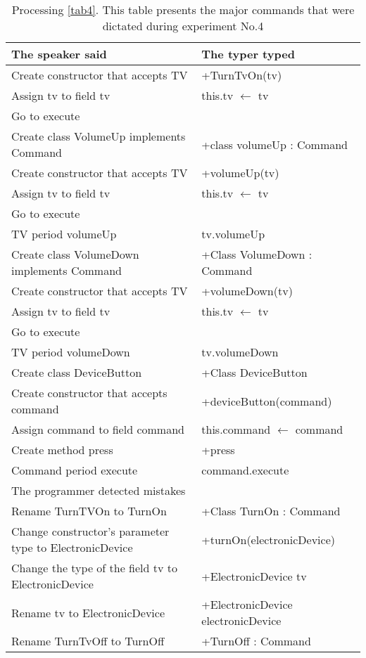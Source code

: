 \begin{table}[H]
	\begin{tabular}{|p{10cm}|p{6cm}|}
		\hline
		\rowcolor[HTML]{9B9B9B} 
		{\color[HTML]{000000} The speaker said} & {\color[HTML]{000000} The typer typed} \\ \hline
		Create constructor that accepts TV & +TurnTvOn(tv) \\ \hline
		Assign tv to field tv & this.tv $\leftarrow$ tv \\ \hline
		Go to execute & \\ \hline
		Create class VolumeUp implements Command & +class volumeUp : Command \\ \hline
		Create constructor that accepts TV & +volumeUp(tv) \\ \hline
		Assign tv to field tv & this.tv $\leftarrow$ tv \\ \hline
		Go to execute & \\ \hline
		TV period volumeUp & tv.volumeUp \\ \hline
		Create class VolumeDown implements Command & +Class VolumeDown : Command \\ \hline
		Create constructor that accepts TV & +volumeDown(tv) \\ \hline
		Assign tv to field tv & this.tv $\leftarrow$ tv \\ \hline
		Go to execute & \\ \hline
		TV period volumeDown & tv.volumeDown \\ \hline
		Create class DeviceButton & +Class DeviceButton \\ \hline
		Create constructor that accepts command & +deviceButton(command) \\ \hline
		Assign command to field command & this.command $\leftarrow$ command \\ \hline
		Create method press & +press \\ \hline
		Command period execute & command.execute \\ \hline
		\rowcolor[HTML]{9B9B9B}The programmer detected mistakes &  \\ \hline
		Rename TurnTVOn to TurnOn & +Class TurnOn : Command \\ \hline
		Change constructor's parameter type to ElectronicDevice & +turnOn(electronicDevice) \\ \hline
		Change the type of the field tv to ElectronicDevice & +ElectronicDevice tv \\ \hline
		Rename tv to ElectronicDevice & +ElectronicDevice electronicDevice \\ \hline
		Rename TurnTvOff to TurnOff & +TurnOff : Command \\ \hline
	\end{tabular}
	\caption{Processing \autoref{tab4}. This table presents the major commands that were dictated during experiment No.4}
	\label{tab5}
\end{table}
